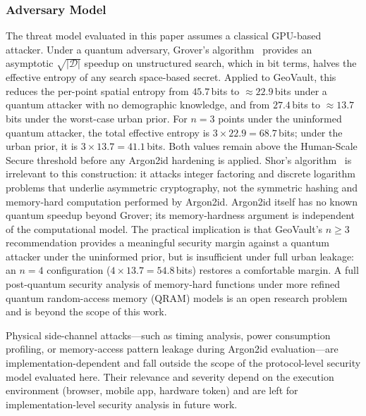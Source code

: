 \documentclass[mathematics,article,accept,pdftex,moreauthors]{Definitions/mdpi}
\begin{document}
\subsubsection*{ Adversary Model}

{The threat model evaluated in this paper assumes a classical GPU-based attacker. Under a quantum adversary, Grover's algorithm~\cite{Grover1996} provides an asymptotic $\sqrt{|\mathcal{D}|}$ speedup on unstructured search, which in bit terms, halves the effective entropy of any search space-based secret. Applied to GeoVault, this reduces the per-point spatial entropy from $45.7$\,bits to $\approx$$22.9$\,bits under a quantum attacker with no demographic knowledge, and from $27.4$\,bits to $\approx$$13.7$\,bits under the worst-case urban prior. For $n=3$ points under the uninformed quantum attacker, the total effective entropy is $3 \times 22.9 = 68.7$\,bits; under the urban prior, it is $3 \times 13.7 = 41.1$\,bits. Both values remain above the Human-Scale Secure threshold before any Argon2id hardening is applied. Shor's algorithm~\cite{Shor1994} is irrelevant to this construction: it attacks integer factoring and discrete logarithm problems that underlie asymmetric cryptography, not the symmetric hashing and memory-hard computation performed by Argon2id. Argon2id itself has no known quantum speedup beyond Grover; its memory-hardness argument is independent of the computational model. The practical implication is that GeoVault's $n \geq 3$ recommendation provides a meaningful security margin against a quantum attacker under the uninformed prior, but is insufficient under full urban leakage: an $n=4$ configuration ($4 \times 13.7 = 54.8$\,bits) restores a comfortable margin. A full post-quantum security analysis of memory-hard functions under more refined quantum random-access memory (QRAM) models is an open research problem and is beyond the scope of this work.}

{Physical side-channel attacks---such as timing analysis, power consumption profiling, or memory-access pattern leakage during Argon2id evaluation---are implementation-dependent and fall outside the scope of the protocol-level security model evaluated here. Their relevance and severity depend on the execution environment (browser, mobile app, hardware token) and are left for implementation-level security analysis in future work.}
\end{document}
